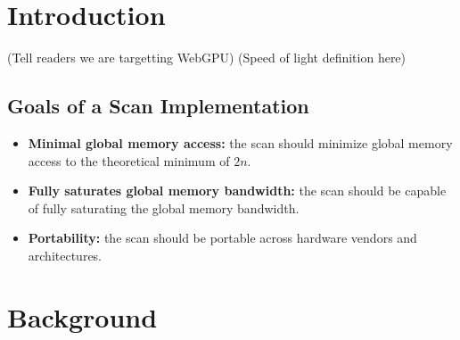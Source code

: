 \documentclass[sigconf]{acmart}
\begin{document}
\section{Introduction}
(Tell readers we are targetting WebGPU)
(Speed of light definition here)
\subsection{Goals of a Scan Implementation}
\begin{itemize}
  \item \textbf{Minimal global memory access:} the scan should minimize global memory access to the theoretical minimum of $2n$.
  \item \textbf{Fully saturates global memory bandwidth:} the scan should be capable of fully saturating the global memory bandwidth.
  \item \textbf{Portability:} the scan should be portable across hardware vendors and architectures.
\end{itemize}

\section{Background}
\end{document}
